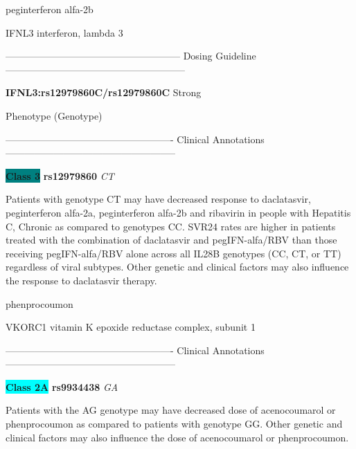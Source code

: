 \documentclass{resume} %
\begin{document}
\begin{rSection}{ peginterferon alfa-2b }
\begin{rSubsection}{ IFNL3 }{ interferon, lambda 3 }{}{}
\item[]
\item[] ------------------------------------------------------ Dosing Guideline --------------------------------------------------------\newline
\item[]
\item[] \textbf{ IFNL3:rs12979860C/rs12979860C } Strong
\item[] Phenotype (Genotype)\newline
\item[] 
\item[] ---------------------------------------------------- Clinical Annotations -----------------------------------------------------\newline
\item \textbf{\colorbox{teal} {Class 3}} \textbf{ rs12979860 } \textit{ CT }
\item[] Patients with genotype CT may have decreased response to daclatasvir, peginterferon alfa-2a, peginterferon alfa-2b and ribavirin in people with Hepatitis C, Chronic as compared to genotypes CC. SVR24 rates are higher in patients treated with the combination of daclatasvir and pegIFN-alfa/RBV than those receiving pegIFN-alfa/RBV alone across all IL28B genotypes (CC, CT, or TT) regardless of viral subtypes. Other genetic and clinical factors may also influence the response to daclatasvir therapy.
\end{rSubsection}

\end{rSection}\begin{rSection}{ phenprocoumon }
\item[]

\begin{rSubsection}{ VKORC1 }{ vitamin K epoxide reductase complex, subunit 1 }{}{}
\item[]

\item[] ---------------------------------------------------- Clinical Annotations -----------------------------------------------------\newline
\item \textbf{\colorbox{cyan} {Class 2A}} \textbf{ rs9934438 } \textit{ GA }
\item[] Patients with the AG genotype may have decreased dose of acenocoumarol or phenprocoumon as compared to patients with genotype GG. Other genetic and clinical factors may also influence the dose of acenocoumarol or phenprocoumon.
\end{rSubsection}


\end{rSection}
\end{document}
